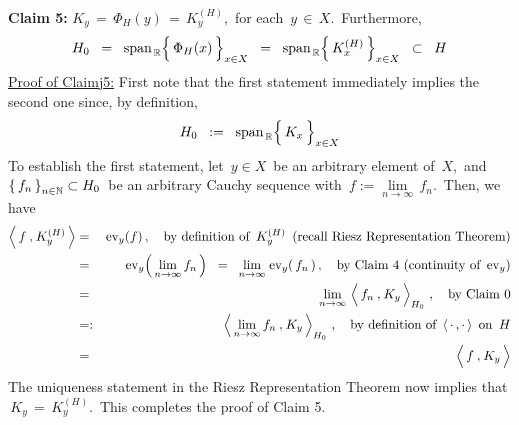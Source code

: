 \vskip 0.5cm
\noindent
\textbf{Claim 5:}\quad
$K_{y} \,=\, \Phi_{H}(y) \,=\, K^{(H)}_{y}$,\, for each \,$y \,\in\, X$.\,
Furthermore,
\begin{equation*}
H_{0}
\;\; = \;\;
	\span_{\,\Re}\!\left\{\,\overset{{\color{white}.}}{\Phi_{H}(x)}\,\right\}_{x \in X}
\;\; = \;\;
	\span_{\,\Re}\!\left\{\,K^{(H)}_{x}\,\right\}_{x \in X}
\;\; \subset \;\;
	H
\end{equation*}
\vskip 0.2cm
\noindent
\underline{Proof of Claim{\color{white}j}5:}
\vskip0.2cm
\noindent
First note that the first statement immediately implies the second one
since, by definition,
\begin{equation*}
H_{0}
\;\; := \;\;
	\span_{\,\Re}\!\left\{\,\overset{{\color{white}.}}{K_{x}}\,\right\}_{x \in X}
\end{equation*}
To establish the first statement,
let \,$y \in X$\, be an arbitrary element of \,$X$,\, and
\,$\left\{\,f_{n}\,\right\}_{n\in\mathbb{N}} \subset H_{0}$\,
be an arbitrary Cauchy sequence with
\,$f := \underset{n\rightarrow\infty}{\lim}\,f_{n}$.\,
Then, we have
\begin{eqnarray*}
\left\langle\,
	\overset{{\color{white}.}}{f} \,\overset{{\color{white}1}}{,}\, K^{(H)}_{y}
	\,\right\rangle
& = &
	\ev_{y}(f)\,,
	\quad
	\textnormal{by definition of \,$K^{(H)}_{y}$\, (recall Riesz Representation Theorem)}
\\
& = &
	\ev_{y}\!\left(\,\underset{n\rightarrow\infty}{\lim}\,f_{n}\,\right)
\;\; = \;\;
	\underset{n\rightarrow\infty}{\lim}\; \ev_{y}\!\left(\,f_{n}\,\right),
	\quad
	\textnormal{by Claim 4 (continuity of \,$\ev_{y}$)}
\\
& = &
	\underset{n\rightarrow\infty}{\lim}\,
	\left\langle\,
		\overset{{\color{white}.}}{f_{n}}\,\overset{{\color{white}1}}{,}\,K_{y}
		\,\right\rangle_{H_{0}}\,,
	\quad
	\textnormal{by Claim 0}
\\
& =: &
	\left\langle\,
		\underset{n\rightarrow\infty}{\lim}\, f_{n}
		\,\overset{{\color{white}1}}{,}\,
		K_{y}
		\,\right\rangle_{H_{0}}\,,
	\quad
	\textnormal{by definition of \,$\langle\,\cdot\,,\cdot\,\rangle$\, on \,$H$}
\\
& = &
	\left\langle\,
		\overset{{\color{white}.}}{f} \,\overset{{\color{white}1}}{,}\, K_{y}
		\,\right\rangle
\end{eqnarray*}
The uniqueness statement in the Riesz Representation Theorem
now implies that \,$K_{y} \,=\, K^{(H)}_{y}$.\,
This completes the proof of Claim 5.

